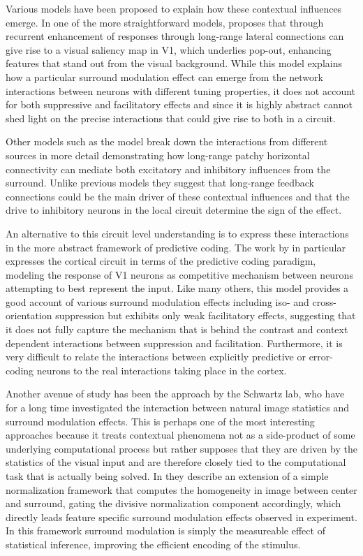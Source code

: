 Various models have been proposed to explain how these contextual
influences emerge. In one of the more straightforward models,
\cite{Li2002} proposes that through recurrent enhancement of responses
through long-range lateral connections can give rise to a visual
saliency map in V1, which underlies pop-out, enhancing features that
stand out from the visual background. While this model explains how a
particular surround modulation effect can emerge from the network
interactions between neurons with different tuning properties, it does
not account for both suppressive and facilitatory effects and since it
is highly abstract cannot shed light on the precise interactions that
could give rise to both in a circuit.

Other models such as the \cite{Schwabe2006} model break down the
interactions from different sources in more detail demonstrating how
long-range patchy horizontal connectivity can mediate both excitatory
and inhibitory influences from the surround. Unlike previous models
they suggest that long-range feedback connections could be the main
driver of these contextual influences and that the drive to inhibitory
neurons in the local circuit determine the sign of the effect.

An alternative to this circuit level understanding is to express these
interactions in the more abstract framework of predictive coding. The
work by \cite{Spratling2010} in particular expresses the cortical
circuit in terms of the predictive coding paradigm, modeling the
response of V1 neurons as competitive mechanism between neurons
attempting to best represent the input. Like many others, this model
provides a good account of various surround modulation effects
including iso- and cross-orientation suppression but exhibits only
weak facilitatory effects, suggesting that it does not fully capture
the mechanism that is behind the contrast and context dependent
interactions between suppression and facilitation. Furthermore, it is
very difficult to relate the interactions between explicitly
predictive or error-coding neurons to the real interactions taking
place in the cortex.

Another avenue of study has been the approach by the Schwartz lab, who
have for a long time investigated the interaction between natural
image statistics and surround modulation effects. This is perhaps one
of the most interesting approaches because it treats contextual
phenomena not as a side-product of some underlying computational
process but rather supposes that they are driven by the statistics of
the visual input and are therefore closely tied to the computational
task that is actually being solved. In \cite{Coen2015} they describe
an extension of a simple normalization framework that computes the
homogeneity in image between center and surround, gating the divisive
normalization component accordingly, which directly leads feature
specific surround modulation effects observed in experiment. In this
framework surround modulation is simply the measureable effect of
statistical inference, improving the efficient encoding of the
stimulus.

